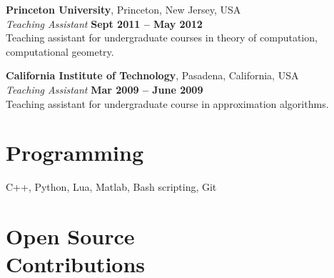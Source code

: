 \documentclass[margin,line]{resume}
\begin{document}
\begin{resume}
    \textbf{Princeton University}, Princeton, New Jersey, USA \vspace{2mm}\\\vspace{1mm}%
    \textsl{Teaching Assistant} \hfill \textbf{Sept 2011 -- May 2012}\\
    Teaching assistant for undergraduate courses in theory of computation, computational geometry.

\newpage

    \textbf{California Institute of Technology}, Pasadena, California, USA \vspace{2mm}\\\vspace{1mm}%
    \textsl{Teaching Assistant} \hfill \textbf{Mar 2009 -- June 2009}\\
    Teaching assistant for undergraduate course in approximation algorithms.


       


    \section{\mysidestyle Programming} 

    C++, Python, Lua, Matlab, Bash scripting, Git

    \section{\mysidestyle Open Source\\Contributions}


\end{resume}
\end{document}
